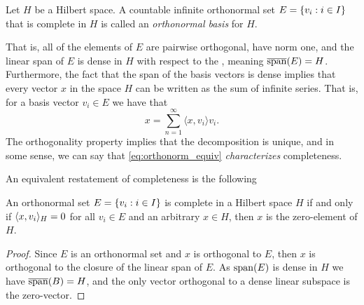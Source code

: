 \documentclass[../thesis.tex]{subfiles}
\begin{document}
\begin{definition}
    Let $H$ be a Hilbert space. A countable infinite orthonormal set $E = \{v_i : i \in I\}$ that is complete in $H$ is called an \emph{orthonormal basis} for $H$.
\end{definition}
That is, all of the elements of $E$ are pairwise orthogonal, have norm one, and the linear span of $E$ is dense in $H$ with respect to the \GenNormH, meaning $\overline{\operatorname{span}}(E) = H$. Furthermore, the fact that the span of the basis vectors is dense implies that every vector $x$ in the space $H$ can be written as the sum of infinite series. That is, for a basis vector $v_i \in E$ we have that
\begin{equation}\label{eq:orthonorm_equiv}
    x= \sum_{n=1}^{\infty} \langle x, v_i \rangle v_i . %
\end{equation}
The orthogonality property implies that the decomposition is unique, and in some sense, we can say that \cref{eq:orthonorm_equiv} \emph{characterizes} completeness.


An equivalent restatement of completeness is the following
\begin{lemma}\label{lem:ONB_alternative_def}
    An orthonormal set $E = \{v_i : i \in I\}$ is complete in a Hilbert space $H$ if and only if $\langle x, v_i\rangle_{H} = 0$ for all $v_i\in E$ and an arbitrary $x\in H$, then $x$ is the zero-element of $H$.
\end{lemma}

\begin{proof}
    Since $E$ is an orthonormal set and $x$ is orthogonal to $E$, then $x$ is orthogonal to the closure of the linear span of $E$. As $\operatorname{span}(E)$ is dense in $H$ we have $\overline{\operatorname{span}}(B) = H$, and the only vector orthogonal to a dense linear subspace is the zero-vector. 
\end{proof}
\end{document}

